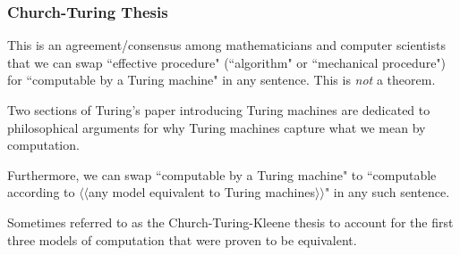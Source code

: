 \documentclass{beamer}
\begin{document}
\begin{frame}
	\frametitle{Church-Turing Thesis}

	This is an agreement/consensus among mathematicians and computer scientists that we can swap ``effective procedure" (``algorithm" or ``mechanical procedure") for ``computable by a Turing machine" in any sentence. This is \emph{not} a theorem. %

	\vspace{0.5cm}

	Two sections of Turing's paper introducing Turing machines are dedicated to philosophical arguments for why Turing machines capture what we mean by computation.

	\vspace{0.5cm}

	Furthermore, we can swap ``computable by a Turing machine" to ``computable according to $\langle\langle$any model equivalent to Turing machines$\rangle\rangle$" in any such sentence. 

	\vspace{0.5cm}

	Sometimes referred to as the Church-Turing-Kleene thesis to account for the first three models of computation that were proven to be equivalent.

	\vspace{3cm}
	
\end{frame}
\end{document}
